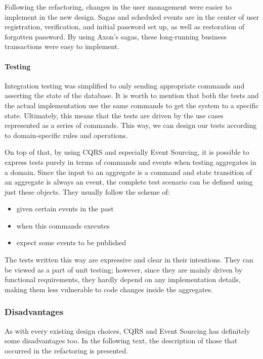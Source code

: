 \documentclass{book}
\begin{document}
Following the refactoring, changes in the user management were easier to
implement in the new design. Sagas and scheduled events are in the
center of user registration, verification, and initial password set up,
as well as restoration of forgotten password. By using Axon's sagas,
these long-running business transactions were easy to implement.

\paragraph{Testing}\label{testing}

Integration testing was simplified to only sending appropriate commands
and asserting the state of the database. It is worth to mention that
both the tests and the actual implementation use the same commands to
get the system to a specific state. Ultimately, this means that the
tests are driven by the use cases represented as a series of commands.
This way, we can design our tests according to domain-specific rules and
operations.

On top of that, by using CQRS and especially Event Sourcing, it is
possible to express tests purely in terms of commands and events when
testing aggregates in a domain. Since the input to an aggregate is a
command and state transition of an aggregate is always an event, the
complete test scenario can be defined using just these objects. They
usually follow the scheme of:

\begin{itemize}
\tightlist
\item
  given certain events in the past
\item
  when this commands executes
\item
  expect some events to be published
\end{itemize}

The tests written this way are expressive and clear in their intentions.
They can be viewed as a part of unit testing; however, since they are
mainly driven by functional requirements, they hardly depend on any
implementation details, making them less vulnerable to code changes
inside the aggregates.


\subsubsection{Disadvantages}\label{disadvantages}

As with every existing design choices, CQRS and Event Sourcing has
definitely some disadvantages too. In the following text, the
description of those that occurred in the refactoring is presented.
\end{document}
